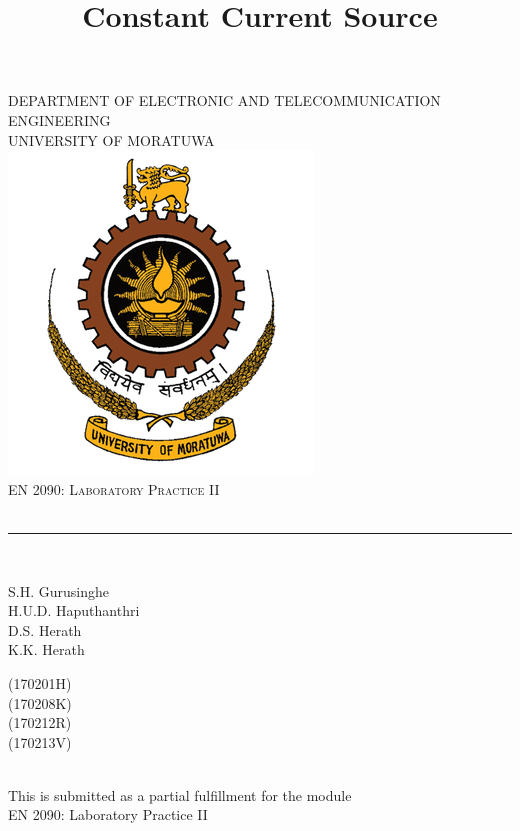 \documentclass[a4paper,12pt]{article}
\title{Constant Current Source}
\makeatletter
\let\thetitle\@title %
\makeatother
\begin{document}
\begin{titlepage}
\newcommand{\HRule}{\rule{\linewidth}{0.5mm}}
\center
\textsc{\small DEPARTMENT OF ELECTRONIC AND TELECOMMUNICATION ENGINEERING\\}
	\textsc{\small UNIVERSITY OF MORATUWA}\\[1.0 cm]
    \vspace*{0.5 cm}
\includegraphics[scale = 0.9]{uom_logo.jpg}\\[1cm]
\textsc{\large EN 2090: Laboratory Practice II}\\[0.8cm]

{ \huge \bfseries \thetitle}\\
\HRule \\[1.0cm]


\begin{minipage}{0.4\textwidth}
		\begin{flushleft}
			S.H. Gurusinghe \\
			H.U.D. Haputhanthri\\
			D.S. Herath\\
			K.K. Herath
			\end{flushleft}
			\end{minipage}
			\begin{minipage}{0.1\textwidth}
			\begin{flushright}
			(170201H)\\ 
			(170208K)\\
			(170212R)\\
			(170213V)
		\end{flushright}
	\end{minipage}\\[1 cm]

This is submitted as a partial fulfillment for the module \\EN 2090: Laboratory Practice II 
\center {\today}
\vfill 
\end{titlepage}
\end{document}
